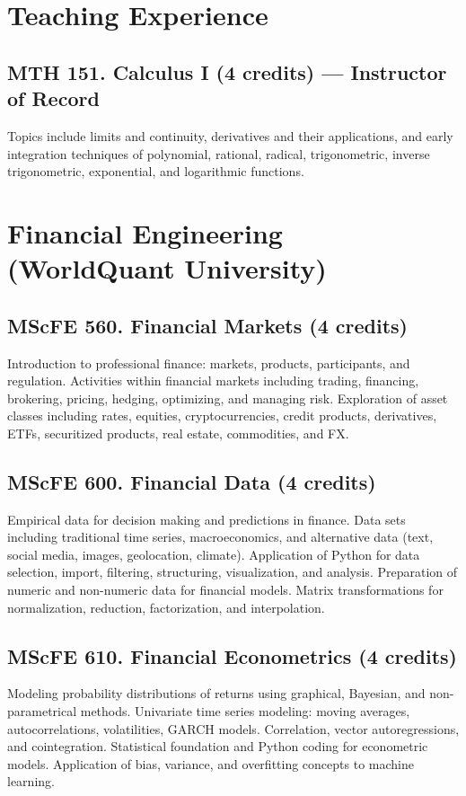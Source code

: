 \documentclass[11pt]{article}
\begin{document}
\section{Teaching Experience}

\subsection{MTH 151. Calculus I \mdseries(4 credits) --- Instructor of Record}
Topics include limits and continuity, derivatives and their applications, and early integration techniques of polynomial, rational, radical, trigonometric, inverse trigonometric, exponential, and logarithmic functions.

\section{Financial Engineering (WorldQuant University)}

\subsection{MScFE 560. Financial Markets \mdseries(4 credits)}
Introduction to professional finance: markets, products, participants, and regulation. Activities within financial markets including trading, financing, brokering, pricing, hedging, optimizing, and managing risk. Exploration of asset classes including rates, equities, cryptocurrencies, credit products, derivatives, ETFs, securitized products, real estate, commodities, and FX.

\subsection{MScFE 600. Financial Data \mdseries(4 credits)}
Empirical data for decision making and predictions in finance. Data sets including traditional time series, macroeconomics, and alternative data (text, social media, images, geolocation, climate). Application of Python for data selection, import, filtering, structuring, visualization, and analysis. Preparation of numeric and non-numeric data for financial models. Matrix transformations for normalization, reduction, factorization, and interpolation.

\subsection{MScFE 610. Financial Econometrics \mdseries(4 credits)}
Modeling probability distributions of returns using graphical, Bayesian, and non-parametrical methods. Univariate time series modeling: moving averages, autocorrelations, volatilities, GARCH models. Correlation, vector autoregressions, and cointegration. Statistical foundation and Python coding for econometric models. Application of bias, variance, and overfitting concepts to machine learning.
\end{document}

